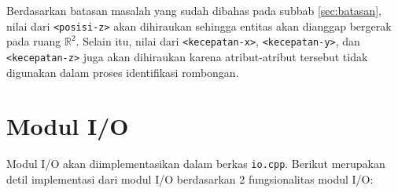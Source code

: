 Berdasarkan batasan masalah yang sudah dibahas pada subbab \ref{sec:batasan}, nilai dari \texttt{<posisi-z>} akan dihiraukan sehingga entitas akan dianggap bergerak pada ruang $\mathbb{R}^2$. Selain itu, nilai dari \texttt{<kecepatan-x>}, \texttt{<kecepatan-y>}, dan \texttt{<kecepatan-z>} juga akan dihiraukan karena atribut-atribut tersebut tidak digunakan dalam proses identifikasi rombongan.

\section{Modul I/O}
\label{sec:impl-io}

Modul I/O akan diimplementasikan dalam berkas \texttt{io.cpp}. Berikut merupakan detil implementasi dari modul I/O berdasarkan 2 fungsionalitas modul I/O:

